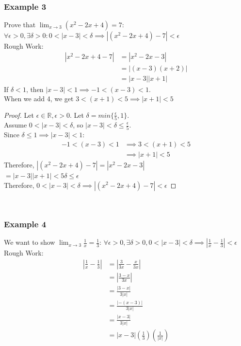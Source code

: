 \documentclass{article}
\begin{document}
\\ \subsubsection{Example 3}
Prove that $\lim_{x\to3}(x^2 - 2x + 4) = 7$: $\forall \epsilon > 0, \exists \delta > 0 : 0 < | x - 3 | < \delta \implies | (x^2 - 2x + 4) - 7 | < \epsilon$
\\
Rough Work:
\begin{align*}
    | x^2 - 2x + 4 - 7 | & = | x^2 - 2x - 3 |\\
    & = | (x-3)(x+2) |\\
    & = | x-3 | | x + 1|
\end{align*}
If $\delta < 1$, then $| x - 3 | < 1 \implies -1 < (x-3) < 1$.\\
When we add 4, we get $3 < (x + 1) < 5 \implies | x + 1 | < 5$
\begin{proof}
Let $\epsilon \in \mathbb{R}, \epsilon > 0$. Let $\delta = min\{\frac{\epsilon}{5}, 1\}$.\\
Assume $0 < | x - 3 | < \delta$, so $| x - 3 | < \delta \leq \frac{\epsilon}{5}$.\\
Since $\delta \leq 1 \implies | x - 3 | < 1$:
\begin{align*}
    -1 < (x-3) < 1 & \implies 3 < (x+1) < 5\\
    & \implies | x + 1 | < 5
\end{align*}
Therefore, $| (x^2 - 2x + 4) - 7 | = | x^2 - 2x - 3 |$\\
$= | x - 3 | | x + 1 | < 5 \delta \leq \epsilon$\\
Therefore, $0 < | x - 3 | < \delta \implies | (x^2 - 2x + 4) - 7 | < \epsilon$
\end{proof}
\\ \subsubsection{Example 4}
We want to show $\lim_{x \to 3} \frac{1}{x} = \frac{1}{3}$: $\forall \epsilon > 0, \exists \delta > 0, 0 < | x - 3 | < \delta \implies | \frac{1}{x} - \frac{1}{3} | < \epsilon$\\
Rough Work:
\begin{align*}
    | \frac{1}{x} - \frac{1}{3} | & = | \frac{3}{3x} - \frac{x}{3x} |\\
    & = | \frac{3 - x}{3x} |\\
    & = \frac{| 3 - x |}{3 | x |}\\
    & = \frac{| -(x-3) |}{3| x |}\\
    & = \frac{| x - 3 |}{3 | x |}\\
    & = | x - 3 | (\frac{1}{3})(\frac{1}{| x |})
\end{align*}
\end{document}
